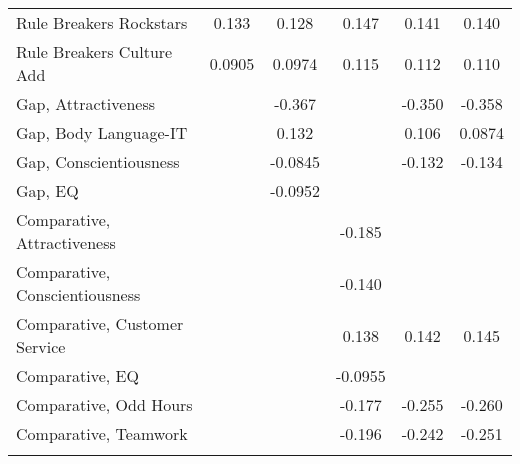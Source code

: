 {\begin{center}
{\begin{longtable}{l*{5}{c}}
\addlinespace
Rule Breakers Rockstars  &       0.133\sym{**} &       0.128\sym{**} &       0.147\sym{**} &       0.141\sym{**} &       0.140\sym{**} \\
\addlinespace
Rule Breakers Culture Add&      0.0905         &      0.0974\sym{*}  &       0.115\sym{**} &       0.112\sym{**} &       0.110\sym{**} \\
\addlinespace
Gap, Attractiveness      &                     &      -0.367\sym{***}&                     &      -0.350\sym{***}&      -0.358\sym{***}\\
\addlinespace
Gap, Body Language-IT    &                     &       0.132         &                     &       0.106         &      0.0874         \\
\addlinespace
Gap, Conscientiousness   &                     &     -0.0845         &                     &      -0.132\sym{**} &      -0.134\sym{**} \\
\addlinespace
Gap, EQ                  &                     &     -0.0952         &                     &                     &                     \\
\addlinespace
Comparative, Attractiveness&                    &                     &      -0.185\sym{*}  &                     &                     \\
\addlinespace
Comparative, Conscientiousness&                     &                     &      -0.140         &                     &                     \\
\addlinespace
Comparative, Customer Service&                     &                     &       0.138         &       0.142\sym{*}  &       0.145\sym{*}  \\
\addlinespace
Comparative, EQ          &                     &                     &     -0.0955         &                     &                     \\
\addlinespace
Comparative, Odd Hours&                     &                     &      -0.177\sym{*}  &      -0.255\sym{***}&      -0.260\sym{***}\\
\addlinespace
Comparative, Teamwork    &                     &                     &      -0.196\sym{*}  &      -0.242\sym{**} &      -0.251\sym{**} \\
\addlinespace

\end{longtable}}
\end{center}}
